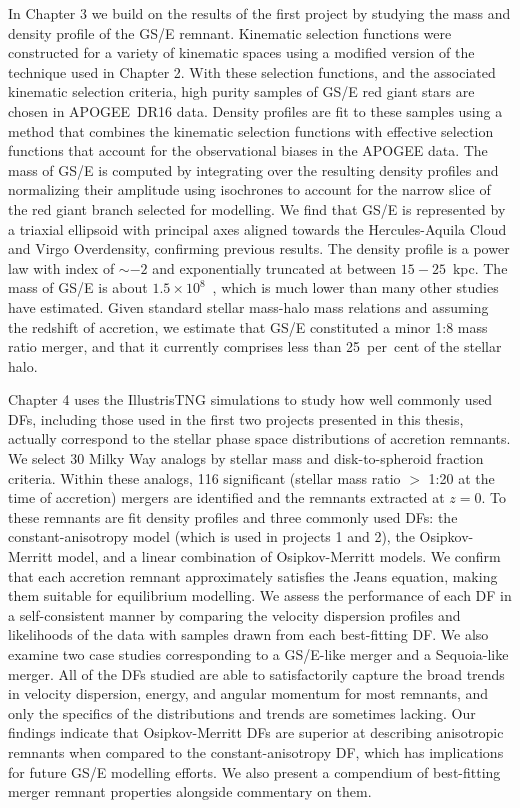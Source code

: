 In Chapter 3 we build on the results of the first project by studying the mass and density profile of the GS/E remnant. Kinematic selection functions were constructed for a variety of kinematic spaces using a modified version of the technique used in Chapter 2. With these selection functions, and the associated kinematic selection criteria, high purity samples of GS/E red giant stars are chosen in APOGEE~DR16 data. Density profiles are fit to these samples using a method that combines the kinematic selection functions with effective selection functions that account for the observational biases in the APOGEE data. The mass of GS/E is computed by integrating over the resulting density profiles and normalizing their amplitude using isochrones to account for the narrow slice of the red giant branch selected for modelling. We find that GS/E is represented by a triaxial ellipsoid with principal axes aligned towards the Hercules-Aquila Cloud and Virgo Overdensity, confirming previous results. The density profile is a power law with index of $\sim -2$ and exponentially truncated at between $15-25$~kpc. The mass of GS/E is about $1.5\times10^{8}$~\Msun, which is much lower than many other studies have estimated. Given standard stellar mass-halo mass relations and assuming the redshift of accretion, we estimate that GS/E constituted a minor 1:8 mass ratio merger, and that it currently comprises less than 25~per~cent of the stellar halo.

Chapter 4 uses the IllustrisTNG simulations to study how well commonly used DFs, including those used in the first two projects presented in this thesis, actually correspond to the stellar phase space distributions of accretion remnants. We select 30 Milky Way analogs by stellar mass and disk-to-spheroid fraction criteria. Within these analogs, 116 significant (stellar mass ratio $>$ 1:20 at the time of accretion) mergers are identified and the remnants extracted at $z=0$. To these remnants are fit density profiles and three commonly used DFs: the constant-anisotropy model (which is used in projects 1 and 2), the Osipkov-Merritt model, and a linear combination of Osipkov-Merritt models. We confirm that each accretion remnant approximately satisfies the Jeans equation, making them suitable for equilibrium modelling. We assess the performance of each DF in a self-consistent manner by comparing the velocity dispersion profiles and likelihoods of the data with samples drawn from each best-fitting DF. We also examine two case studies corresponding to a GS/E-like merger and a Sequoia-like merger. All of the DFs studied are able to satisfactorily capture the broad trends in velocity dispersion, energy, and angular momentum for most remnants, and only the specifics of the distributions and trends are sometimes lacking. Our findings indicate that Osipkov-Merritt DFs are superior at describing anisotropic remnants when compared to the constant-anisotropy DF, which has implications for future GS/E modelling efforts. We also present a compendium of best-fitting merger remnant properties alongside commentary on them.